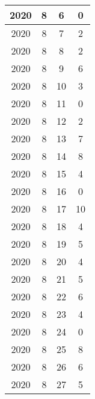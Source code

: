 \begin{longtable} {|c|c|c|c|}
\hline
2020         & 8            & 6            & 0                         \\ 
\hline
2020         & 8            & 7            & 2                         \\ 
\hline
2020         & 8            & 8            & 2                         \\ 
\hline
2020         & 8            & 9            & 6                         \\ 
\hline
2020         & 8            & 10           & 3                         \\ 
\hline
2020         & 8            & 11           & 0                         \\ 
\hline
2020         & 8            & 12           & 2                         \\ 
\hline
2020         & 8            & 13           & 7                         \\ 
\hline
2020         & 8            & 14           & 8                         \\ 
\hline
2020         & 8            & 15           & 4                         \\ 
\hline
2020         & 8            & 16           & 0                         \\ 
\hline
2020         & 8            & 17           & 10                        \\ 
\hline
2020         & 8            & 18           & 4                         \\ 
\hline
2020         & 8            & 19           & 5                         \\ 
\hline
2020         & 8            & 20           & 4                         \\ 
\hline
2020         & 8            & 21           & 5                         \\ 
\hline
2020         & 8            & 22           & 6                         \\ 
\hline
2020         & 8            & 23           & 4                         \\ 
\hline
2020         & 8            & 24           & 0                         \\ 
\hline
2020         & 8            & 25           & 8                         \\ 
\hline
2020         & 8            & 26           & 6                         \\ 
\hline
2020         & 8            & 27           & 5                         \\ 

\end{longtable}
